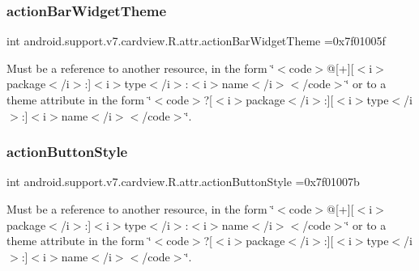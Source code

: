 \subsubsection{\texorpdfstring{action\+Bar\+Widget\+Theme}{actionBarWidgetTheme}}
{\footnotesize\ttfamily int android.\+support.\+v7.\+cardview.\+R.\+attr.\+action\+Bar\+Widget\+Theme =0x7f01005f\hspace{0.3cm}{\ttfamily [static]}}

Must be a reference to another resource, in the form \char`\"{}$<$code$>$@\mbox{[}+\mbox{]}\mbox{[}$<$i$>$package$<$/i$>$\+:\mbox{]}$<$i$>$type$<$/i$>$\+:$<$i$>$name$<$/i$>$$<$/code$>$\char`\"{} or to a theme attribute in the form \char`\"{}$<$code$>$?\mbox{[}$<$i$>$package$<$/i$>$\+:\mbox{]}\mbox{[}$<$i$>$type$<$/i$>$\+:\mbox{]}$<$i$>$name$<$/i$>$$<$/code$>$\char`\"{}. \mbox{\label{classandroid_1_1support_1_1v7_1_1cardview_1_1R_1_1attr_ab251494f5d7882098a14ab434e23c38f}} 
\subsubsection{\texorpdfstring{action\+Button\+Style}{actionButtonStyle}}
{\footnotesize\ttfamily int android.\+support.\+v7.\+cardview.\+R.\+attr.\+action\+Button\+Style =0x7f01007b\hspace{0.3cm}{\ttfamily [static]}}

Must be a reference to another resource, in the form \char`\"{}$<$code$>$@\mbox{[}+\mbox{]}\mbox{[}$<$i$>$package$<$/i$>$\+:\mbox{]}$<$i$>$type$<$/i$>$\+:$<$i$>$name$<$/i$>$$<$/code$>$\char`\"{} or to a theme attribute in the form \char`\"{}$<$code$>$?\mbox{[}$<$i$>$package$<$/i$>$\+:\mbox{]}\mbox{[}$<$i$>$type$<$/i$>$\+:\mbox{]}$<$i$>$name$<$/i$>$$<$/code$>$\char`\"{}. \mbox{\label{classandroid_1_1support_1_1v7_1_1cardview_1_1R_1_1attr_a969d499ccb6506d8b945d61bc9df3d55}} 
